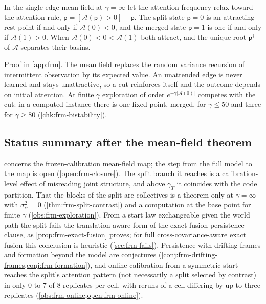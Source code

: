 \begin{proposition}\label{prop:frm-bistability}
In the single-edge mean field at $\gamma=\infty$ let the attention frequency relax toward the attention rule, $\dot{\mathsf p}=[\mathcal A(\mathsf p)>0]-\mathsf p$. The split state $\mathsf p=0$ is an attracting rest point if and only if $\mathcal A(0)<0$, and the merged state $\mathsf p=1$ is one if and only if $\mathcal A(1)>0$. When $\mathcal A(0)<0<\mathcal A(1)$ both attract, and the unique root $\mathsf p^\dagger$ of $\mathcal A$ separates their basins.
\end{proposition}
Proof in \cref{app:frm}. The mean field replaces the random variance recursion of intermittent observation by its expected value. An unattended edge is never learned and stays unattractive, so a cut reinforces itself and the outcome depends on initial attention. At finite $\gamma$ exploration of order $e^{-\gamma|\mathcal A(0)|}$ competes with the cut: in a computed instance there is one fixed point, merged, for $\gamma\le50$ and three for $\gamma\ge80$ (\cref{chk:frm-bistability}).

\subsection{Status summary after the mean-field theorem}\label{sup:frm-status-summary-after-the-mean-field-theo}

 concerns the frozen-calibration mean-field map; the step from the full model to the map is open (\cref{open:frm-closure}). The split branch it reaches is a calibration-level effect of misreading joint structure, and above $\gamma_T$ it coincides with the code partition. That the blocks of the split are collectives is a theorem only at $\gamma=\infty$ with $\sigma_\alpha^2=0$ (\cref{thm:frm-split-contrast}) and a computation at the base point for finite $\gamma$ (\cref{obs:frm-exploration}). From a start law exchangeable given the world path the split fails the translation-aware form of the exact-fusion persistence clause, as \cref{prop:frm-exact-fusion} proves; for full cross-covariance-aware exact fusion this conclusion is heuristic (\cref{sec:frm-fails}). Persistence with drifting frames and formation beyond the model are conjectures (\cref{conj:frm-drifting-frames,conj:frm-formation}), and online calibration from a symmetric start reaches the split's attention pattern (not necessarily a split selected by contrast) in only 0 to 7 of 8 replicates per cell, with reruns of a cell differing by up to three replicates (\cref{obs:frm-online,open:frm-online}).

